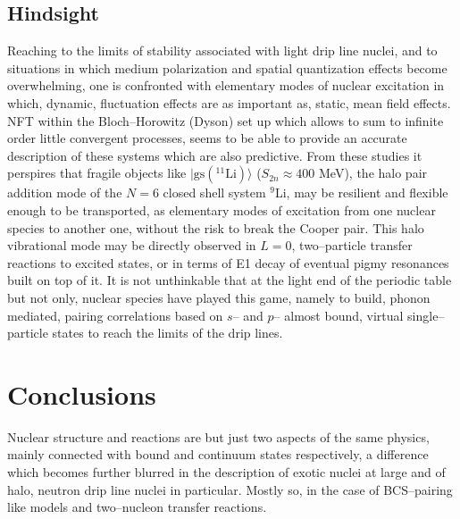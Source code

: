 \documentclass[a4paper,14pt]{book}
\begin{document}



\subsection{Hindsight}
Reaching to the limits of stability associated with light drip line nuclei, and to situations in which medium polarization and spatial quantization effects become overwhelming, one is confronted with elementary modes of nuclear excitation in which, dynamic, fluctuation effects are as important as, static, mean field effects. NFT within the Bloch--Horowitz (Dyson) set up which allows to sum to infinite order little convergent processes, seems to be able to provide an accurate description of these systems which are also predictive. From these studies it perspires that fragile objects like $|\text{gs}(^{11}\text{Li})\rangle$ ($S_{2n}\approx 400$ MeV), the halo pair addition mode of the $N=6$ closed shell system $^9$Li, may be resilient and flexible enough to be transported, as elementary modes of excitation from one nuclear species to another one, without the risk to break the Cooper pair. This  halo vibrational mode may be directly observed in $L=0$, two--particle transfer reactions to excited states, or in terms of E1 decay of eventual pigmy resonances built on top of it. It is not unthinkable that  at the light end of the periodic table but not only, nuclear species have played this game, namely to build, phonon mediated, pairing correlations based on $s$-- and $p$-- almost bound, virtual single--particle states to reach the limits of the drip lines.

\section{Conclusions}
Nuclear structure and reactions are but just two aspects of the same physics, mainly connected with bound and continuum states respectively, a difference which becomes further blurred in the description of exotic nuclei at large and of halo, neutron drip line nuclei in particular. Mostly so, in the case of BCS--pairing like models and two--nucleon transfer reactions.
\end{document}
